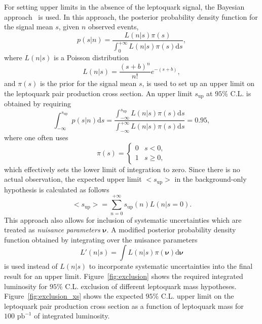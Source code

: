 For setting upper limits in the absence of the leptoquark signal, the Bayesian approach~\cite{ref:bayes} is used. In this approach, the
posterior probability density function for the signal mean $s$, given $n$ observed events,
\begin{equation}
p(s|n)=\frac{L(n|s)\pi(s)}{\int_0^{+\infty}L(n|s)\pi(s)\mathrm{d}s},
\end{equation}
where $L(n|s)$ is a Poisson distribution
\begin{equation}
L(n|s)=\frac{(s+b)^n}{n!}e^{-(s+b)},
\end{equation}
and $\pi(s)$ is the prior for the signal mean $s$, is used to set up an upper limit on the leptoquark pair production cross section.
An upper limit $s_\text{up}$ at $95\%$ C.L. is obtained by requiring
\begin{equation}
\int_{-\infty}^{s_\text{up}}p(s|n)\mathrm{d}s=\frac{\int_{-\infty}^{s_\text{up}}L(n|s)\pi(s)\mathrm{d}s}{\int_{-\infty}^{+\infty}L(n|s)\pi(s)\mathrm{d}s}=0.95, 
\end{equation}
where one often uses
\begin{equation}
\pi(s)=\begin{cases}
          0&  s<0,\\
          1&  s\geq 0,
\end{cases}
\end{equation}
which effectively sets the lower limit of integration to zero. Since there is no actual observation, the expected 
upper limit $\mathrm{<}s_\text{up}\mathrm{>}$ in the background-only hypothesis is calculated as follows
\begin{equation}
\mathrm{<}s_\text{up}\mathrm{>}=\sum_{n=0}^{+\infty} s_\text{up}(n)L(n|s=0).
\end{equation}
This approach also allows for inclusion of systematic uncertainties which are treated as \emph{nuisance parameters} $\bm{\nu}$.
A modified posterior probability density function obtained by integrating over the nuisance parameters
\begin{equation}
L'(n|s)=\int L(n|s)\pi(\bm{\nu})\mathrm{d}\bm{\nu}
\end{equation}
is used instead of $L(n|s)$ to incorporate systematic uncertainties into the final result for an upper limit. Figure~\ref{fig:exclusion}
shows the required integrated luminosity for $95\%$ C.L. exclusion of different leptoquark mass hypotheses. Figure~\ref{fig:exclusion_xs}
shows the expected $95\%$ C.L. upper limit on the leptoquark pair production cross section as a function of leptoquark mass for $100\text{ pb}^{-1}$
of integrated luminosity. 

